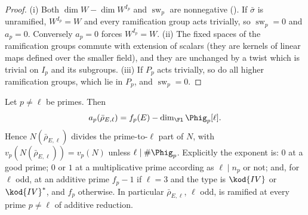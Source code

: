 \begin{proof}
(i) Both $\dim W-\dim W^{I_p}$ and $\operatorname{sw}_p$ are nonnegative (). If $\bar\sigma$ is unramified, $W^{I_p}=W$ and every ramification group acts
trivially, so $\operatorname{sw}_p=0$ and $a_p=0$. Conversely $a_p=0$ forces $W^{I_p}=W$. (ii) The fixed spaces of the ramification groups commute with
extension of scalars (they are kernels of linear maps defined over the smaller field), and they are unchanged by a twist which is trivial on
$I_p$ and its subgroups. (iii) If $P_p$ acts trivially, so do all higher ramification groups, which lie in $P_p$, and $\operatorname{sw}_p=0$.
\end{proof}

\begin{proposition}\label{prop:galrep:serre-conductor-E}
Let $p\ne\ell$ be primes. Then
\[
a_p(\bar\rho_{E,\ell})=f_p(E)-\dim_{\Fl}\Phig_p[\ell].
\]
Hence $N(\bar\rho_{E,\ell})$ divides the prime-to-$\ell$ part of $N$, with $v_p(N(\bar\rho_{E,\ell}))=v_p(N)$ unless $\ell\mid\#\Phig_p$. Explicitly the exponent is: $0$ at a
good prime; $0$ or $1$ at a multiplicative prime according as $\ell\mid n_p$ or not; and, for $\ell$ odd, at an additive prime $f_p-1$ if $\ell=3$ and the type
is $\kod{IV}$ or $\kod{IV}^*$, and $f_p$ otherwise. In particular $\bar\rho_{E,\ell}$, $\ell$ odd, is ramified at every prime $p\ne\ell$ of additive reduction.
\end{proposition}

